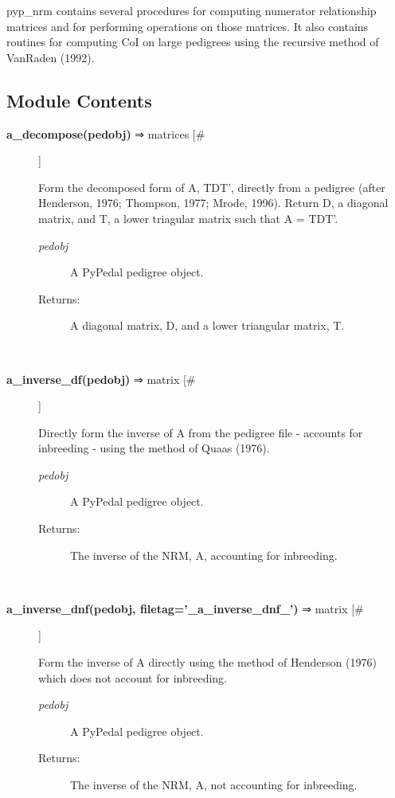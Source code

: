 

 pyp\_nrm contains several procedures for computing numerator relationship matrices and for performing operations on those matrices. It also contains routines for computing CoI on large pedigrees using the recursive method of VanRaden (1992).
\subsection*{Module Contents}
\begin{description}
\item[\textbf{a\_decompose(pedobj)}
 ⇒ matrices [\#]]

 Form the decomposed form of A, TDT', directly from a pedigree (after Henderson, 1976; Thompson, 1977; Mrode, 1996). Return D, a diagonal matrix, and T, a lower triagular matrix such that A = TDT'.
\begin{description}
\item[\emph{pedobj}
] A PyPedal pedigree object.
\item[Returns:] A diagonal matrix, D, and a lower triangular matrix, T.

\end{description}
\\ 

\item[\textbf{a\_inverse\_df(pedobj)}
 ⇒ matrix [\#]]

 Directly form the inverse of A from the pedigree file - accounts for inbreeding - using the method of Quaas (1976).
\begin{description}
\item[\emph{pedobj}
] A PyPedal pedigree object.
\item[Returns:] The inverse of the NRM, A, accounting for inbreeding.

\end{description}
\\ 

\item[\textbf{a\_inverse\_dnf(pedobj, filetag='\_a\_inverse\_dnf\_')}
 ⇒ matrix [\#]]

 Form the inverse of A directly using the method of Henderson (1976) which does not account for inbreeding.
\begin{description}
\item[\emph{pedobj}
] A PyPedal pedigree object.
\item[Returns:] The inverse of the NRM, A, not accounting for inbreeding.

\end{description}
\\ 


\end{description}
